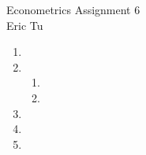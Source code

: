 \documentclass{article}
\begin{document}
\begin{center}
Econometrics Assignment 6 \\
Eric Tu
\end{center}

\begin{enumerate}[label=(\alph*)]

	\item
	
	\item
		\begin{enumerate}[label=(\roman*)]
			\item
			 
			\item
		\end{enumerate}
	
	\item
	
	\item

	\item
	
\end{enumerate}
\end{document}
